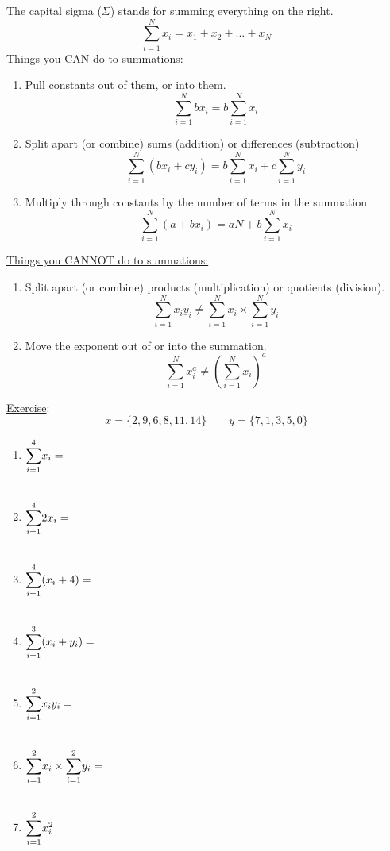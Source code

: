 \documentclass{./../../Latex/handout}
\begin{document}
\thispagestyle{plain}

The capital sigma ($\Sigma$) stands for summing everything on the right. 
$$ \sum_{i=1}^N x_i = x_1 + x_2 + ... + x_N $$
\underline{Things you CAN do to summations:}
\begin{enumerate}
\item Pull constants out of them, or into them.
$$ \sum_{i=1}^N b x_i = b \sum_{i=1}^N x_i  $$
\item Split apart (or combine) sums (addition) or differences (subtraction)
$$ \sum_{i=1}^N (b x_i + c y_i) = b \sum_{i=1}^N x_i  + c \sum_{i=1}^N y_i $$
\item Multiply through constants by the number of terms in the summation
$$ \sum_{i=1}^N (a+b x_i)= aN + b \sum_{i=1}^N x_i  $$
\end{enumerate}

\underline{Things you CANNOT do to summations:}
\begin{enumerate}
\item Split apart (or combine) products (multiplication) or quotients (division).
$$ \sum_{i=1}^N x_i y_i \neq  \sum_{i=1}^N x_i \times \sum_{i=1}^N y_i   $$
\item Move the exponent out of or into the summation.
$$ \sum_{i=1}^N x_i^a \neq  \left(\sum_{i=1}^N x_i\right)^a $$
\end{enumerate}

\underline{Exercise}:
$$ x = \{2,9,6,8,11,14\} \quad \quad y = \{7,1,3,5,0\}$$ 
\begin{enumerate}
\item $\mathlarger{\sum}_{i=1}^4 x_i = $ \\~\\
\item $\mathlarger{\sum}_{i=1}^4 2 x_i = $ \\~\\
\item $\mathlarger{\sum}_{i=1}^4 (x_i+4) = $ \\~\\
\item $\mathlarger{\sum}_{i=1}^3 (x_i+y_i) = $ \\~\\
\item $\mathlarger{\sum}_{i=1}^2 x_i y_i = $ \\~\\
\item $\mathlarger{\sum}_{i=1}^2 x_i \times \mathlarger{\sum}_{i=1}^2 y_i = $ \\~\\
\item $\mathlarger{\sum}_{i=1}^2 x_i^2 $ \\~\\
\end{enumerate}
\end{document}
